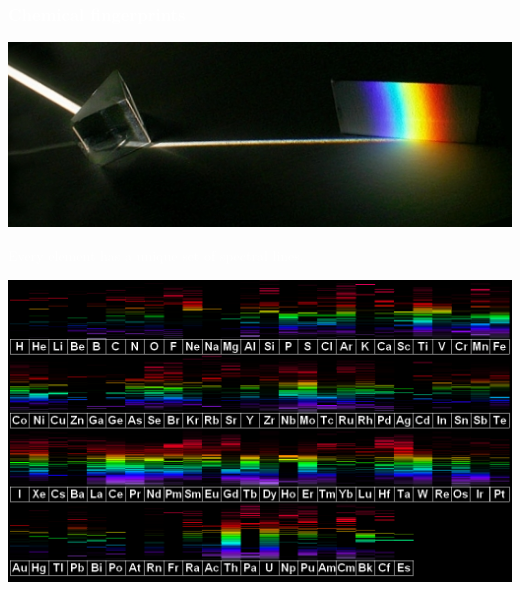 \documentclass[compress]{beamer}
\begin{document}
\begingroup
{}
\begin{frame}
\frametitle{\textcolor{white}{Chemical fingerprints}}
\begin{center}
\includegraphics[width=0.5\linewidth]{pictures/prism.jpg}

\textcolor{white}{Every element has a unique set of spectral lines.}

\includegraphics[width=0.9\linewidth]{pictures/spectral_tableofelements.png}
\end{center}
\end{frame}
\end{document}
